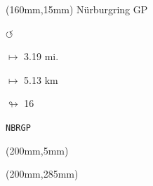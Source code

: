 \begin{textblock*}{40mm}(160mm,15mm)%
Nürburgring GP
\par \Huge$\circlearrowleft$
\Large
\par$\mapsto$ 3.19 mi.
\par$\mapsto$ 5.13 km
\par$\looparrowright$ 16
\par\hfill\tiny\tt NBRGP\\
\end{textblock*}
\begin{textblock*}{20mm}(200mm,5mm)%
\fbox{\thepage}
\end{textblock*}
\begin{textblock*}{20mm}(200mm,285mm)%
\fbox{\thepage}
\end{textblock*}
\null\newpage

